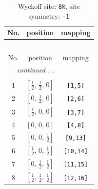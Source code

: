 \documentclass[fleqn,8pt]{jsarticle}
\begin{document}
\renewcommand{\arraystretch}{1.2}
\begin{longtable}{ccc}
\caption{Wyckoff site: {\tt 8k}, site symmetry: {\tt -1}}
 \\
 \hline \hline
No. & position & mapping \\ \hline \endfirsthead

\multicolumn{2}{l}{\tablename\ \thetable{}} \\
 \hline \hline
No. & position & mapping \\ \hline \endhead

 \hline \hline
\multicolumn{2}{r}{\footnotesize\it continued ...} \\ \endfoot

 \hline \hline
\multicolumn{2}{r}{} \\ \endlastfoot

1 & $\left[ \frac{1}{2},\, \frac{1}{2},\, 0 \right]$ & {\tt [1,5]} \\ \hline
2 & $\left[ 0,\, \frac{1}{2},\, 0 \right]$ & {\tt [2,6]} \\ \hline
3 & $\left[ \frac{1}{2},\, 0,\, 0 \right]$ & {\tt [3,7]} \\ \hline
4 & $\left[ 0,\, 0,\, 0 \right]$ & {\tt [4,8]} \\ \hline
5 & $\left[ 0,\, 0,\, \frac{1}{2} \right]$ & {\tt [9,13]} \\ \hline
6 & $\left[ \frac{1}{2},\, 0,\, \frac{1}{2} \right]$ & {\tt [10,14]} \\ \hline
7 & $\left[ 0,\, \frac{1}{2},\, \frac{1}{2} \right]$ & {\tt [11,15]} \\ \hline
8 & $\left[ \frac{1}{2},\, \frac{1}{2},\, \frac{1}{2} \right]$ & {\tt [12,16]} \\
\end{longtable}
\renewcommand{\arraystretch}{1.2}
\end{document}
